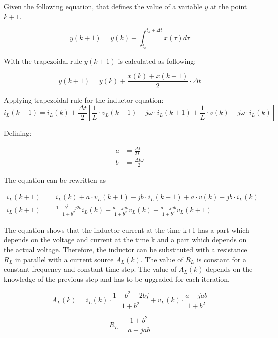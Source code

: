Given the following equation, that defines the value of a variable $y$ at the point $k+1$.

\begin{equation}
	y(k+1) = y(k) + \int_{t_k}^{t_k+ \Delta t} x(\tau)d \tau
\end{equation}

With the trapezoidal rule $y(k+1)$ is calculated as following:

\begin{equation}
	y(k+1)=y(k)+ \frac{x(k)+x(k+1)}{2} \cdot \Delta t
\end{equation}

Applying trapezoidal rule for the inductor equation:
\begin{equation}
        i_L(k+1) = i_L(k) + \frac{\Delta t}{2} \left[ \frac{1}{L} \cdot v_L(k+1) - j \omega \cdot i_L(k+1) + \frac{1}{L} \cdot v(k) - j \omega \cdot i_L(k) \right]
\end{equation}

Defining:

\begin{align}
	a &= \frac{\Delta t}{2L} \\
	b &= \frac{\Delta t \omega}{2}
\end{align}
		
The equation can be rewritten as

\begin{align}
        i_L(k+1) &= i_L(k) + a \cdot v_L(k+1) - j b \cdot i_L(k+1) + a \cdot v(k) - j b \cdot i_L(k) \\
        i_L(k+1) &= \frac{1-b^2-j2b}{1+b^2}i_L(k) + \frac{a-jab}{1+b^2} v_L(k) + \frac{a-jab}{1+b^2} v_L(k+1)
\end{align}

The equation shows that the inductor current at the time k+1 has a part which depends on the voltage and current at the time k and a part which depends on the actual voltage. Therefore, the inductor can be substituted with a resistance $R_L$ in parallel with a current source $A_L(k)$. The value of $R_L$ is constant for a constant frequency and constant time step. The value of $A_L(k)$ depends on the knowledge of the previous step and has to be upgraded for each iteration.
 
\begin{equation} \label{eq:AL}
	A_L(k) = i_L(k) \cdot \frac{1-b^2-2bj}{1+b^2} + v_L(k) \cdot \frac{a-jab}{1+b^2}
\end{equation}

\begin{equation}
	R_L = \frac{1+b^2}{a-jab}
\end{equation}	

